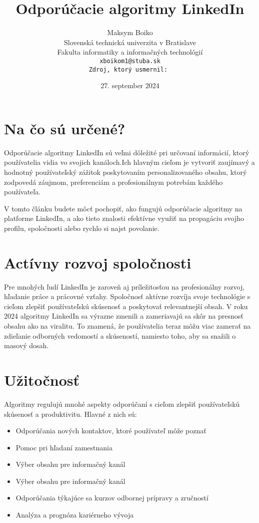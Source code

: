 \documentclass[twoside,slovak,a4paper]{coursepaper}
\title{Odporúčacie algoritmy LinkedIn\centering}
\author{Maksym Boiko\\[2pt]
{ Slovenská technická univerzita v Bratislave}\\
{ Fakulta informatiky a informačných technológií}\\
{\texttt{xboikom1@stuba.sk}}\\
{\texttt{Zdroj, ktorý usmernil:~\cite{Oladipo:article}}}
}
\date{\small 27. september 2024}
\begin{document}
\maketitle

\section{Na čo sú určené?}
Odporúčacie algoritmy LinkedIn sú veľmi dôležité pri určovaní informácií, ktorý používatelia vidia vo svojich kanáloch.Ich hlavným cieľom je vytvoriť zaujímavý a hodnotný používateľský zážitok poskytovaním personalizovaného obsahu, ktorý zodpovedá záujmom, preferenciám a profesionálnym potrebám každého používateľa.

V tomto článku budete môcť pochopiť, ako fungujú odporúčacie algoritmy na platforme LinkedIn, a ako tieto znalosti efektívne využiť na propagáciu svojho profilu, spoločnosti alebo rychlo si najst povolanie.~\cite{Gabric:article}

\section{Actívny rozvoj spoločnosti} \label{rozvoj spoločnosti}

Pre mnohých ľudí LinkedIn je zaroveň aj príležitosťou na profesionálny rozvoj, hľadanie práce a prácovné vzťahy.
Spoločnosť aktívne rozvíja svoje technológie s cieľom zlepšiť používateľskú skúsenosť a poskytovať relevantnejší obsah. V roku 2024 algoritmy LinkedIn sa výrazne zmenili a zameriavajú sa skôr na presnosť obsahu ako na viralitu. To znamená, že používatelia teraz môžu viac zamerať na zdieľanie odborných vedomostí a skúseností, namiesto toho, aby sa snažili o masový dosah.~\cite{Oladipo:article}

\section{Užitočnosť} \label{Užitočnosť}
Algoritmy regulujú mnohé aspekty odporúčaní s cieľom zlepšiť používateľskú skúsenosť a produktivitu. Hlavné z nich sú:

\begin{itemize}
	\item Odporúčania nových kontaktov, ktoré používateľ môže poznať
	\item Pomoc pri hľadaní zamestnania
	\item Výber obsahu pre informačný kanál
	\item Výber obsahu pre informačný kanál
	\item Odporúčania týkajúce sa kurzov odbornej prípravy a zručností
	\item Analýza a prognóza kariérneho vývoja
  \end{itemize}
\end{document}
